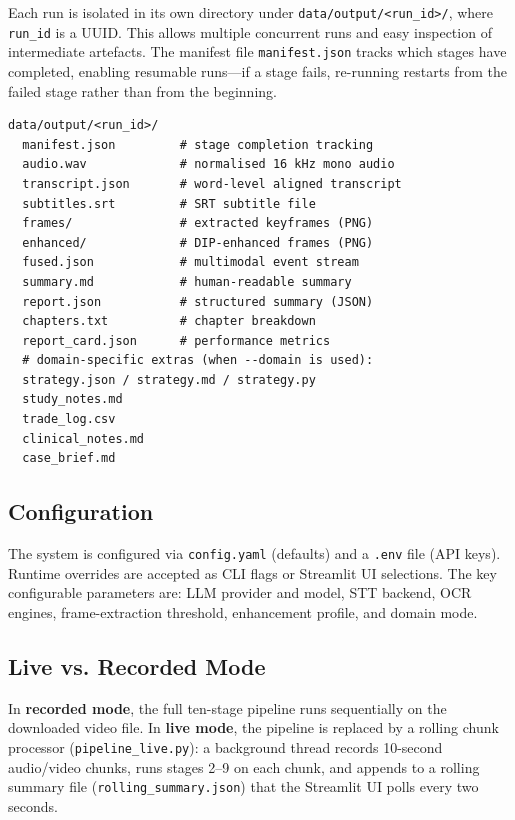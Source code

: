 \documentclass[12pt,a4paper]{article}
\begin{document}
Each run is isolated in its own directory under \texttt{data/output/<run\_id>/}, where
\texttt{run\_id} is a UUID. This allows multiple concurrent runs and easy inspection of
intermediate artefacts. The manifest file \texttt{manifest.json} tracks which stages have
completed, enabling resumable runs—if a stage fails, re-running restarts from the
failed stage rather than from the beginning.

\begin{lstlisting}[style=plain, caption={Per-run output directory layout.}]
data/output/<run_id>/
  manifest.json         # stage completion tracking
  audio.wav             # normalised 16 kHz mono audio
  transcript.json       # word-level aligned transcript
  subtitles.srt         # SRT subtitle file
  frames/               # extracted keyframes (PNG)
  enhanced/             # DIP-enhanced frames (PNG)
  fused.json            # multimodal event stream
  summary.md            # human-readable summary
  report.json           # structured summary (JSON)
  chapters.txt          # chapter breakdown
  report_card.json      # performance metrics
  # domain-specific extras (when --domain is used):
  strategy.json / strategy.md / strategy.py
  study_notes.md
  trade_log.csv
  clinical_notes.md
  case_brief.md
\end{lstlisting}

\subsection{Configuration}

The system is configured via \texttt{config.yaml} (defaults) and a \texttt{.env} file
(API keys). Runtime overrides are accepted as CLI flags or Streamlit UI selections. The
key configurable parameters are: LLM provider and model, STT backend, OCR engines,
frame-extraction threshold, enhancement profile, and domain mode.

\subsection{Live vs. Recorded Mode}

In \textbf{recorded mode}, the full ten-stage pipeline runs sequentially on the
downloaded video file. In \textbf{live mode}, the pipeline is replaced by a rolling
chunk processor (\texttt{pipeline\_live.py}): a background thread records 10-second
audio/video chunks, runs stages 2--9 on each chunk, and appends to a rolling summary
file (\texttt{rolling\_summary.json}) that the Streamlit UI polls every two seconds.
\end{document}
